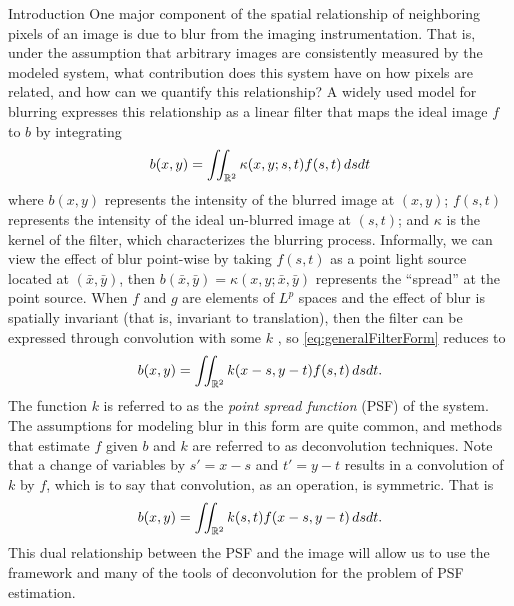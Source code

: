 \begin{chapter}{Introduction}
  One major component of the spatial relationship of neighboring pixels of an image is due to blur from the imaging instrumentation.
  That is, under the assumption that arbitrary images are consistently measured by the modeled system, what contribution does this system have on how pixels are related, and how can we quantify this relationship?
  A widely used model for blurring \citep{hansen2010,jain1989,vogel2002,epstein2008} expresses this relationship as a linear filter that maps the ideal image $f$ to $b$ by integrating
\begin{equation}\label{eq:generalFilterForm}
  b(x,y) = \iint_{\mathbb R^2} \kappa(x,y;s,t) f(s,t)\,dsdt
\end{equation}
  where $b(x,y)$ represents the intensity of the blurred image at $(x,y)$; $f(s,t)$ represents the intensity of the ideal un-blurred image at $(s,t)$; and $\kappa$ is the kernel of the filter, which characterizes the blurring process.
  Informally, we can view the effect of blur point-wise by taking $f(s,t)$ as a point light source located at $(\bar x,\bar y)$, then $b(\bar x,\bar y) = \kappa(x,y;\bar x,\bar y)$ represents the ``spread'' at the point source.
  When $f$ and $g$ are elements of $L^p$ spaces and the effect of blur is spatially invariant (that is, invariant to translation), then the filter can be expressed through convolution with some $k$ \citep{grafakos2014}, so \eqref{eq:generalFilterForm} reduces to
\begin{equation}\label{eq:deconvolutionProblem}
  b(x,y) = \iint_{\mathbb R^2} k(x-s,y-t) f(s,t)\,dsdt.
\end{equation}
  The function $k$ is referred to as the \emph{point spread function} (PSF) of the system.
  The assumptions for modeling blur in this form are quite common, and methods that estimate $f$ given $b$ and $k$ are referred to as deconvolution techniques.
  Note that a change of variables by $s'=x-s$ and $t'=y-t$ results in a convolution of $k$ by $f$, which is to say that convolution, as an operation, is symmetric.
  That is
\begin{equation}\label{eq:dualConvolutionDeterministic}
  b(x,y) = \iint_{\mathbb R^2} k(s,t) f(x-s,y-t)\,dsdt.
\end{equation}
  This dual relationship between the PSF and the image will allow us to use the framework and many of the tools of deconvolution for the problem of PSF estimation.


\end{chapter}
